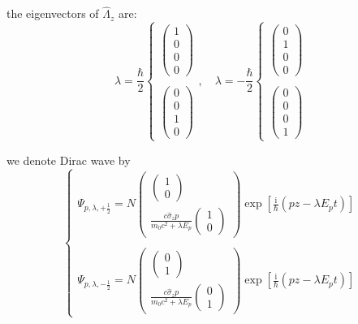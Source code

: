 the eigenvectors of $\hat{\Lambda}_z$ are:
\begin{equation}
\lambda = \frac{\hbar}{2} \begin{cases} \begin{pmatrix} 1 \\ 0 \\ 0 \\ 0 \end{pmatrix} \\ \\ \begin{pmatrix} 0 \\ 0 \\ 1 \\ 0 \end{pmatrix} \end{cases}, \quad \lambda = -\frac{\hbar}{2} \begin{cases} \begin{pmatrix} 0 \\ 1 \\ 0 \\ 0 \end{pmatrix} \\ \\ \begin{pmatrix} 0 \\ 0 \\ 0 \\ 1 \end{pmatrix} \end{cases}
\end{equation}

we denote Dirac wave by
\begin{equation}
\begin{cases}
\Psi_{p,\lambda,+\frac{1}{2}} = N \begin{pmatrix} \begin{pmatrix} 1 \\ 0 \end{pmatrix} \\ \frac{c\hat{\sigma}_z p}{m_0 c^2 + \lambda E_p} \begin{pmatrix} 1 \\ 0 \end{pmatrix} \end{pmatrix} \exp\left[ \frac{\mathrm{i}}{\hbar}(pz - \lambda E_p t) \right] \\ \\
\Psi_{p,\lambda,-\frac{1}{2}} = N \begin{pmatrix} \begin{pmatrix} 0 \\ 1 \end{pmatrix} \\ \frac{c\hat{\sigma}_z p}{m_0 c^2 + \lambda E_p} \begin{pmatrix} 0 \\ 1 \end{pmatrix} \end{pmatrix} \exp\left[ \frac{\mathrm{i}}{\hbar}(pz - \lambda E_p t) \right]
\end{cases}
\end{equation}